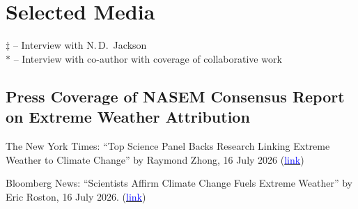 \documentclass{article}[12pt]
\begin{document}
	
	
	
	\vspace{-3em}
	\section*{Selected Media}
	
	$\ddagger$ -- Interview with N.\,D.~Jackson \\
	$\ast$ -- Interview with co-author with coverage of collaborative work
	
	\vspace{-0.5em}
	
	\subsection*{Press Coverage of NASEM Consensus Report on Extreme Weather Attribution}
	
	\begin{etaremune}[]
		
		\item The New York Times: ``Top Science Panel Backs Research Linking Extreme Weather to Climate Change'' by Raymond Zhong, 16 July 2026 (\href{https://www.nytimes.com/2026/07/16/climate/national-academies-extreme-weather-attribution.html}{\textcolor{blue}{link}})
		
		\item Bloomberg News: ``Scientists Affirm Climate Change Fuels Extreme Weather'' by Eric Roston, 16 July 2026. (\href{https://www.bloomberg.com/news/articles/2026-07-16/climate-change-fuels-extreme-weather-events-scientists-affirm}{\textcolor{blue}{link}})
		
		
	\end{etaremune}
	
	
\end{document}
